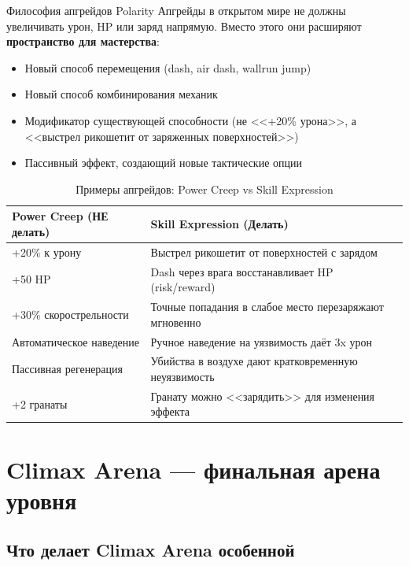 \documentclass[a4paper,11pt]{report}
\begin{document}
\begin{polarity}{Философия апгрейдов Polarity}
Апгрейды в открытом мире не должны увеличивать урон, HP или заряд
напрямую. Вместо этого они расширяют \textbf{пространство для
мастерства}:
\begin{itemize}
  \item Новый способ перемещения (dash, air dash, wallrun jump)
  \item Новый способ комбинирования механик
  \item Модификатор существующей способности (не <<+20\% урона>>,
    а <<выстрел рикошетит от заряженных поверхностей>>)
  \item Пассивный эффект, создающий новые тактические опции
\end{itemize}
\end{polarity}

\begin{table}[H]
\centering
\caption{Примеры апгрейдов: Power Creep vs Skill Expression}
\begin{tabularx}{\textwidth}{@{}XX@{}}
\toprule
\textbf{Power Creep (НЕ делать)} & \textbf{Skill Expression (Делать)} \\
\midrule
+20\% к урону & Выстрел рикошетит от поверхностей с зарядом \\
+50 HP & Dash через врага восстанавливает HP (risk/reward) \\
+30\% скорострельности & Точные попадания в слабое место перезаряжают мгновенно \\
Автоматическое наведение & Ручное наведение на уязвимость даёт 3x урон \\
Пассивная регенерация & Убийства в воздухе дают кратковременную неуязвимость \\
+2 гранаты & Гранату можно <<зарядить>> для изменения эффекта \\
\bottomrule
\end{tabularx}
\end{table}


\chapter{Climax Arena --- финальная арена уровня}

\section{Что делает Climax Arena особенной}
\end{document}
